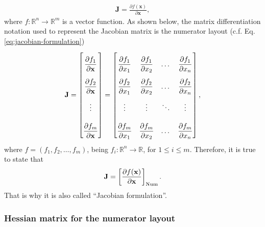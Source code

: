\documentclass{article}
\begin{document}
\begin{align}
    \mathbf{J} = \frac{\partial f(\mathbf{x})}{\partial \mathbf{x}},
\end{align}
where \(f: \mathbb{R}^{n} \rightarrow \mathbb{R}^{m}\) is a vector function. As shown below, the matrix differentiation notation used to represent the Jacobian matrix is the numerator layout (c.f. Eq.\eqref{eq:jacobian-formulation})
\begin{align}
    \label{eq:jacobian-matrix}
    \mathbf{J} = \renewcommand{\arraystretch}{2.6} \begin{bmatrix}
        \dfrac{\partial f_1}{\partial \mathbf{x}} \\
        \dfrac{\partial f_2}{\partial \mathbf{x}} \\ 
        \vdots \\ 
        \dfrac{\partial f_m}{\partial \mathbf{x}}
    \end{bmatrix} = \begin{bmatrix}
        \dfrac{\partial f_1}{\partial x_1} & \dfrac{\partial f_1}{\partial x_2} & \dots & \dfrac{\partial f_1}{\partial x_n} \\
        \dfrac{\partial f_2}{\partial x_1} & \dfrac{\partial f_2}{\partial x_2} & \dots & \dfrac{\partial f_2}{\partial x_n} \\
        \vdots & \vdots & \ddots & \vdots \\
        \dfrac{\partial f_m}{\partial x_1} & \dfrac{\partial f_m}{\partial x_2} & \dots & \dfrac{\partial f_m}{\partial x_n} \\
    \end{bmatrix},
\end{align}
where \(f = (f_1, f_2, \dots, f_m)\), being \(f_i: \mathbb{R}^n \rightarrow \mathbb{R}\), for \(1 \leq i \leq m\). Therefore, it is true to state that
\begin{align}
    \mathbf{J} = \left[ \frac{\partial f(\mathbf{x})}{\partial \mathbf{x}} \right]_{\textnormal{Num}}.
\end{align}
That is why it is also called ``Jacobian formulation''.

\subsubsection{Hessian matrix for the numerator layout}
\end{document}
